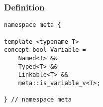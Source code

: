
\subsubsection{Definition}

\begin{verbatim}
namespace meta {

template <typename T>
concept bool Variable =
	Named<T> &&
	Typed<T> &&
	Linkable<T> &&
	meta::is_variable_v<T>;

} // namespace meta
\end{verbatim}
